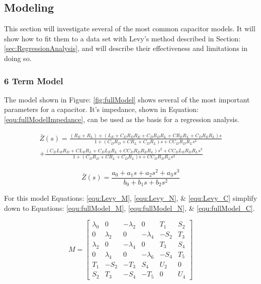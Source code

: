 


\subsection{Modeling}
This section will investigate several of the most common capacitor models. It will show how to fit them to a data set with Levy's method described in Section: \ref{sec:RegressionAnalysis}, and will describe their effectiveness and limitations in doing so.

\subsubsection{6 Term Model}


The model shown in Figure: \ref{fig:fullModel} shows several of the most important parameters for a capacitor. It's impedance, shown in Equation: \eqref{equ:fullModelImpedance}, can be used as the basis for a regression analysis.

\begin{equation}
\begin{split}
\label{equ:fullModelImpedance}
\bar{Z}(s) = \frac{(R_E + R_L) + (L_E + C_DR_DR_E + C_DR_DR_L + CR_ER_L + C_DR_ER_L)s}{1 + (C_DR_D + CR_L + C_DR_L)s + CC_DR_DR_Ls^2} \\ 
+ \frac{(C_DL_ER_D + CL_ER_L + C_DL_ER_L + CC_DR_DR_ER_L)s^2 + CC_DL_ER_DR_Ls^3}{1 + (C_DR_D + CR_L + C_DR_L)s + CC_DR_DR_Ls^2}
\end{split}
\end{equation}

\begin{equation}
\label{equ:fullModelPoly}
\bar{Z}(s) = \frac{a_0 + a_1s + a_2s^2 + a_3s^3}{b_0 + b_1s + b_2s^2}
\end{equation}


For this model Equations: \eqref{equ:Levy_M}, \eqref{equ:Levy_N}, \& \eqref{equ:Levy_C} simplify down to Equations: \eqref{equ:fullModel_M}, \eqref{equ:fullModel_N}, \& \eqref{equ:fullModel_C}.

\begin{equation}
\label{equ:fullModel_M}
M = 
\begin{bmatrix}
\lambda _0 & 0          & -\lambda _2 & 0           &  T_1    & S_2 \\
0          & \lambda _2 & 0           & -\lambda _4 & -S_2    & T_3 \\
\lambda _2 & 0          & -\lambda _4 & 0           &  T_3    & S_4 \\
0          & \lambda _4 & 0           & -\lambda _6 & -S_4    & T_5 \\
T_1        & -S_2       & -T_3        &  S_4        &  U_2    & 0   \\
S_2        &  T_3       & -S_4        & -T_5        &  0      & U_4
\end{bmatrix}
\end{equation}

